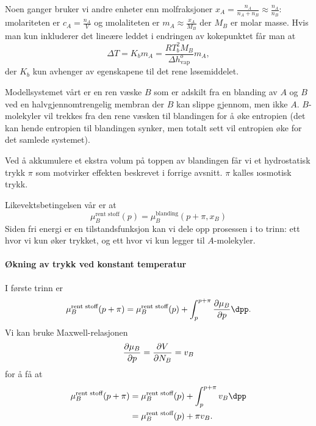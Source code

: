 
Noen ganger bruker vi andre enheter enn molfraksjoner $x_A=\frac{n_A}{n_A+n_B}\approx\frac{n_A}{n_B}$: \i{molaritet}en er $c_A=\frac{n_A}{V}$ og \i{molalitet}en er $m_A\approx\frac{x_A}{M_B}$ der $M_B$ er molar masse. Hvis man kun inkluderer det lineære leddet i endringen av kokepunktet får man at 
\begin{equation}
	\Delta T = K_bm_A=\frac{RT_b^2M_B}{\Delta h_{\text{vap}}^o}m_A,
\end{equation} der $K_b$ kun avhenger av egenskapene til det rene løsemiddelet.

Modellsystemet vårt er en ren væske $B$ som er adskilt fra en blanding av $A$ og $B$ ved en halvgjennomtrengelig membran der $B$ kan slippe gjennom, men ikke $A$. $B$-molekyler vil trekkes fra den rene væsken til blandingen for å øke entropien (det kan hende entropien til blandingen synker, men totalt sett vil entropien øke for det samlede systemet).

Ved å akkumulere et ekstra volum på toppen av blandingen får vi et hydrostatisk trykk $\pi$ som motvirker effekten beskrevet i forrige avsnitt. $\pi$ kalles \i{osmotisk trykk}.

Likevektsbetingelsen vår er at 
\begin{equation}
	\label{yetanotherequilibrium}
	\mu_B^{\text{rent stoff}}(p)=\mu_B^{\text{blanding}}(p+\pi,x_B)
\end{equation}
Siden fri energi er en tilstandsfunksjon kan vi dele opp prosessen i to trinn: ett hvor vi kun øker trykket, og ett hvor vi kun legger til $A$-molekyler.

\paragraph{Økning av trykk ved konstant temperatur} I første trinn er 
\begin{equation}
	\mu_B^{\text{rent stoff}}(p+\pi) = \mu_B^{\text{rent stoff}}(p) + \int_{p}^{p+\pi}\spdif{\mu_B}{p}\dpp.
\end{equation}
Vi kan bruke Maxwell-relasjonen
\begin{equation}
	\frac{\partial \mu_B}{\partial p}=\frac{\partial V}{\partial N_B}=v_B
\end{equation}
for å få at
\begin{align}
\begin{split}
	\mu_B^{\text{rent stoff}}(p+\pi) &= \mu_B^{\text{rent stoff}}(p) + \int_{p}^{p+\pi}v_B\dpp \\
	&=\mu_B^{\text{rent stoff}}(p) + \pi v_B.
\end{split}
\end{align}


